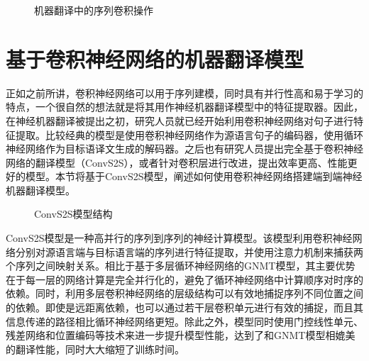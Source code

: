 \begin{figure}[htp]
\centering
%

\caption{机器翻译中的序列卷积操作}
\label{fig:11-11}
\end{figure}

\sectionnewpage
\section{基于卷积神经网络的机器翻译模型}

\parinterval 正如之前所讲，卷积神经网络可以用于序列建模，同时具有并行性高和易于学习的特点，一个很自然的想法就是将其用作神经机器翻译模型中的特征提取器。因此，在神经机器翻译被提出之初，研究人员就已经开始利用卷积神经网络对句子进行特征提取。比较经典的模型是使用卷积神经网络作为源语言句子的编码器，使用循环神经网络作为目标语译文生成的解码器。之后也有研究人员提出完全基于卷积神经网络的翻译模型（ConvS2S），或者针对卷积层进行改进，提出效率更高、性能更好的模型。本节将基于ConvS2S模型，阐述如何使用卷积神经网络搭建端到端神经机器翻译模型。

\begin{figure}[htp]
\centering

\caption{ConvS2S模型结构}
\label{fig:11-12}
\end{figure}

\parinterval ConvS2S模型是一种高并行的序列到序列的神经计算模型。该模型利用卷积神经网络分别对源语言端与目标语言端的序列进行特征提取，并使用注意力机制来捕获两个序列之间映射关系。相比于基于多层循环神经网络的GNMT模型，其主要优势在于每一层的网络计算是完全并行化的，避免了循环神经网络中计算顺序对时序的依赖。同时，利用多层卷积神经网络的层级结构可以有效地捕捉序列不同位置之间的依赖。即使是远距离依赖，也可以通过若干层卷积单元进行有效的捕捉，而且其信息传递的路径相比循环神经网络更短。除此之外，模型同时使用门控线性单元、残差网络和位置编码等技术来进一步提升模型性能，达到了和GNMT模型相媲美的翻译性能，同时大大缩短了训练时间。

